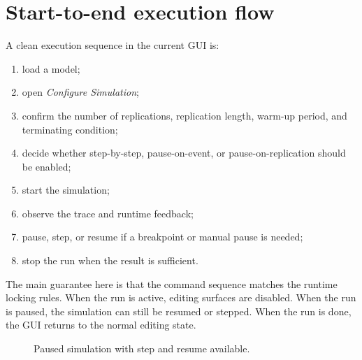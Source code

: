 \section{Start-to-end execution flow}
\label{sec:running-simulations-sequence}

A clean execution sequence in the current GUI is:
\begin{enumerate}
\item load a model;
\item open \textit{Configure Simulation};
\item confirm the number of replications, replication length, warm-up period,
and terminating condition;
\item decide whether step-by-step, pause-on-event, or pause-on-replication
should be enabled;
\item start the simulation;
\item observe the trace and runtime feedback;
\item pause, step, or resume if a breakpoint or manual pause is needed;
\item stop the run when the result is sufficient.
\end{enumerate}

The main guarantee here is that the command sequence matches the runtime
locking rules. When the run is active, editing surfaces are disabled. When the
run is paused, the simulation can still be resumed or stepped. When the run is
done, the GUI returns to the normal editing state.

\begin{figure}[htbp]
\centering
\caption{Paused simulation with step and resume available.}
\label{fig:running-simulations-paused}
\end{figure}

